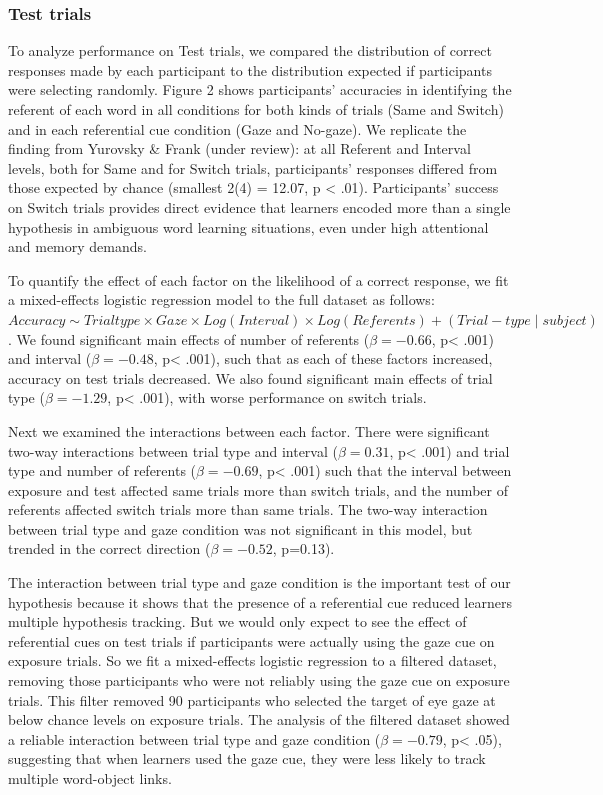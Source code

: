 \documentclass[12pt,]{article}
\begin{document}
\subsubsection{Test trials}\label{test-trials}

To analyze performance on Test trials, we compared the distribution of
correct responses made by each participant to the distribution expected
if participants were selecting randomly. Figure 2 shows participants'
accuracies in identifying the referent of each word in all conditions
for both kinds of trials (Same and Switch) and in each referential cue
condition (Gaze and No-gaze). We replicate the finding from Yurovsky \&
Frank (under review): at all Referent and Interval levels, both for Same
and for Switch trials, participants' responses differed from those
expected by chance (smallest 2(4) = 12.07, p \textless{} .01).
Participants' success on Switch trials provides direct evidence that
learners encoded more than a single hypothesis in ambiguous word
learning situations, even under high attentional and memory demands.

To quantify the effect of each factor on the likelihood of a correct
response, we fit a mixed-effects logistic regression model to the full
dataset as follows:
\(Accuracy \sim Trial type \times Gaze \times Log(Interval) \times Log(Referents) + (Trial-type \mid subject)\).
We found significant main effects of number of referents
(\(\beta = -0.66\), p\textless{} .001) and interval (\(\beta = -0.48\),
p\textless{} .001), such that as each of these factors increased,
accuracy on test trials decreased. We also found significant main
effects of trial type (\(\beta = -1.29\), p\textless{} .001), with worse
performance on switch trials.

Next we examined the interactions between each factor. There were
significant two-way interactions between trial type and interval
(\(\beta = 0.31\), p\textless{} .001) and trial type and number of
referents (\(\beta =-0.69\), p\textless{} .001) such that the interval
between exposure and test affected same trials more than switch trials,
and the number of referents affected switch trials more than same
trials. The two-way interaction between trial type and gaze condition
was not significant in this model, but trended in the correct direction
(\(\beta = -0.52\), p=0.13).

The interaction between trial type and gaze condition is the important
test of our hypothesis because it shows that the presence of a
referential cue reduced learners multiple hypothesis tracking. But we
would only expect to see the effect of referential cues on test trials
if participants were actually using the gaze cue on exposure trials. So
we fit a mixed-effects logistic regression to a filtered dataset,
removing those participants who were not reliably using the gaze cue on
exposure trials. This filter removed 90 participants who selected the
target of eye gaze at below chance levels on exposure trials. The
analysis of the filtered dataset showed a reliable interaction between
trial type and gaze condition (\(\beta = -0.79\), p\textless{} .05),
suggesting that when learners used the gaze cue, they were less likely
to track multiple word-object links.
\end{document}

